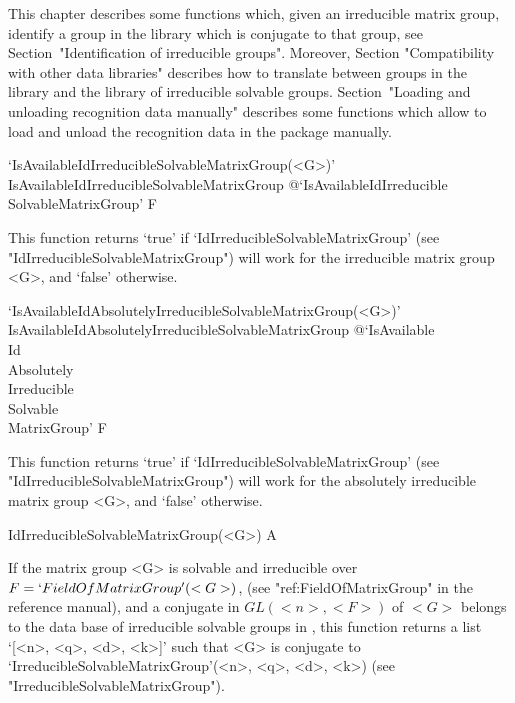 


This chapter describes some functions which, given an irreducible matrix 
group, identify a group in the {\IRREDSOL} library which is conjugate
to that group, see Section~"Identification of irreducible groups".
Moreover,  Section "Compatibility with other data libraries" describes
how to  translate between groups in the {\IRREDSOL} library and the
{\GAP}  library of irreducible solvable groups. 
Section~"Loading and unloading recognition data manually" describes some 
functions which allow to load and unload the recognition data in the 
{\IRREDSOL} package manually.


\>`IsAvailableIdIrreducibleSolvableMatrixGroup(<G>)'%
{IsAvailableIdIrreducibleSolvableMatrixGroup}%
@{`IsAvailableIdIrreducible\\SolvableMatrixGroup'} F

This function returns `true' if `IdIrreducibleSolvableMatrixGroup' (see
"IdIrreducibleSolvableMatrixGroup") will work for the irreducible matrix group <G>, and `false' otherwise.

\>`IsAvailableIdAbsolutelyIrreducibleSolvableMatrixGroup(<G>)'%
{IsAvailableIdAbsolutelyIrreducibleSolvableMatrixGroup}%
@{`IsAvailable\\Id\\Absolutely\\Irreducible\\Solvable\\MatrixGroup'} F

This function returns `true' if `IdIrreducibleSolvableMatrixGroup' (see
"IdIrreducibleSolvableMatrixGroup") will work for the absolutely irreducible matrix group <G>, and `false' otherwise.


\>IdIrreducibleSolvableMatrixGroup(<G>) A

If the matrix group <G> is solvable and irreducible over $F
= `FieldOfMatrixGroup'(<G>)$, (see "ref:FieldOfMatrixGroup" in the {\GAP} reference manual), and a conjugate in
$GL(<n>, <F>)$ of $<G>$ belongs to the data base of  irreducible solvable groups in
{\IRREDSOL}, this function returns a list `[<n>, <q>, <d>, <k>]' such that <G> is
conjugate to  `IrreducibleSolvableMatrixGroup'(<n>, <q>, <d>, <k>) (see
"IrreducibleSolvableMatrixGroup").

